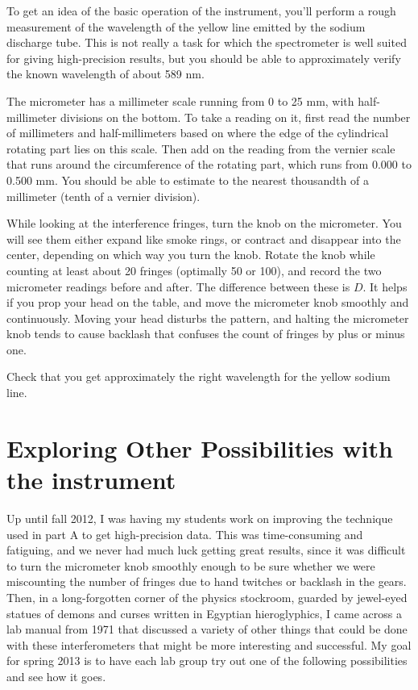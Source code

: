 
To get an idea of the basic operation of the instrument, you'll perform a rough
measurement of the wavelength of the yellow line emitted by the sodium discharge tube.
This is not really a task for which the spectrometer is well suited for giving high-precision
results, but you should be able to approximately verify the known wavelength of
about 589 nm.

The micrometer has a millimeter scale running from 0 to 25 mm, with half-millimeter
divisions on the bottom. To take a reading on it, first read the number of
millimeters and half-millimeters based on where the edge of the cylindrical
rotating part lies on this scale. Then add on the reading from the vernier
scale that runs around the circumference of the rotating part, which runs from
0.000 to 0.500 mm. You should be able to estimate to the nearest thousandth of
a millimeter (tenth of a vernier division).

While looking at the interference fringes, turn the knob on the micrometer.
You will see them either expand like smoke rings, or contract and disappear
into the center, depending on which way you turn the knob. Rotate the knob
while counting at least about 20 fringes (optimally 50 or 100), and record the two micrometer readings before and
after. The difference between these is $D$. It helps if you prop your head on the table, and move the micrometer knob
smoothly and continuously. Moving your head disturbs the pattern, and halting the
micrometer knob tends to cause backlash that confuses the count of fringes by
plus or minus one. 

Check that you get approximately the right wavelength for the yellow sodium line.

\section*{Exploring Other Possibilities with the instrument}

Up until fall 2012, I was having my students work on improving the technique
used in part A to get high-precision data. This was time-consuming and fatiguing,
and we never had much luck getting great results, since it was difficult to
turn the micrometer knob smoothly enough to be sure whether we were miscounting
the number of fringes due to hand twitches or backlash in the gears. Then, in
a long-forgotten corner of the physics stockroom, guarded by jewel-eyed statues
of demons and curses written in Egyptian hieroglyphics, I came across a lab manual
from 1971 that discussed a variety of other things that could be done with these
interferometers that might be more interesting and successful. My goal for spring
2013 is to have each lab group try out one of the following possibilities and see
how it goes.

